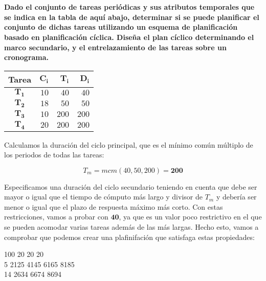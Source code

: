 \section{}

\textbf{Dado el conjunto de tareas periódicas y sus atributos temporales que se indica en la tabla de aquí abajo, determinar si se puede planificar el conjunto de dichas tareas utilizando un esquema de planificación basado en planificación cíclica.
Diseña el plan cíclico determinando el marco secundario, y el entrelazamiento de las tareas sobre un cronograma.}

\begin{center}
	\begin{tabular}{|c|rrr|}
		\hline
		\textbf{Tarea} & $\boldsymbol{C_i}$ & $\boldsymbol{T_i}$ & $\boldsymbol{D_i}$ \\
		\hline
		\hline
		$\boldsymbol{T_1}$ & $10$ & $40$ & $40$   \\
		$\boldsymbol{T_2}$ & $18$ & $50$ & $50$   \\
		$\boldsymbol{T_3}$ & $10$ & $200$ & $200$ \\
		$\boldsymbol{T_4}$ & $20$ & $200$ & $200$ \\
		\hline
	\end{tabular}
\end{center}

Calculamos la duración del ciclo principal, que es el mínimo común múltiplo de los periodos de todas las tareas:

\[T_m=mcm(40,50,200)=\boldsymbol{200}\]

Especificamos una duración del ciclo secundario teniendo en cuenta que debe ser mayor o igual que el tiempo de cómputo más largo y divisor de $T_m$ y debería ser menor o igual que el plazo de respuesta máximo más corto.
Con estas restricciones, vamos a probar con $\boldsymbol{40}$, ya que es un valor poco restrictivo en el que se pueden acomodar varias tareas además de las más largas.
Hecho esto, vamos a comprobar que podemos crear una plafinifación que satisfaga estas propiedades:

\begin{center}
	\begin{ganttchart}[x unit=1.5mm, hgrid=true, vgrid={{dotted}}]{1}{100}
		  {20}
		 {20}
		 {20}
		 \\

		 {5}
		\ganttbar{}     {21}{25}
		\ganttbar{}     {41}{45}
		\ganttbar{}     {61}{65}
		\ganttbar{}     {81}{85} \\
		 {14}
		\ganttbar{}     {26}{34}
		\ganttbar{}     {66}{74}
		\ganttbar{}     {86}{94} \\
		 \\
	\end{ganttchart}
\end{center}

